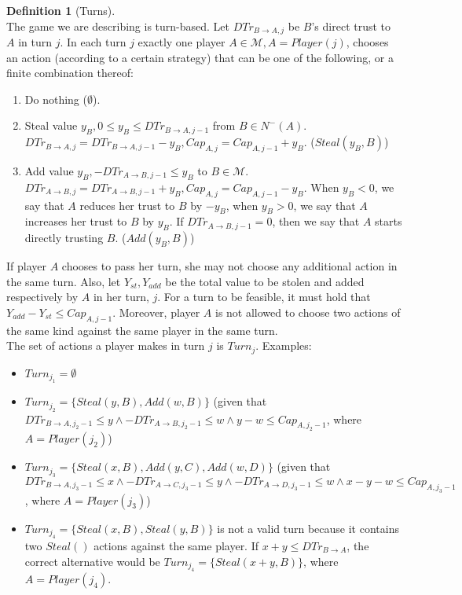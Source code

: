 \documentclass[11pt]{article}
\theoremstyle{definition}
\newtheorem{definition}{Definition}[section]
\theoremstyle{corollary}
\theoremstyle{lemma}
\begin{document}
      \begin{definition}[Turns] \ \\
         The game we are describing is turn-based. Let $DTr_{B \rightarrow A, j}$ be $B$'s direct trust to $A$ in turn $j$.
         In each turn $j$ exactly one player $A \in \mathcal{M}, A = Player(j)$, chooses an action (according to a certain
         strategy) that can be one of the following, or a finite combination thereof:
         \begin{enumerate}
            \item Do nothing ($\emptyset$).
            \item Steal value $y_B, 0 \leq y_B \leq DTr_{B \rightarrow A, j-1}$ from $B \in N^{-}(A)$.
            $DTr_{B \rightarrow A, j} = DTr_{B \rightarrow A, j-1} - y_B, Cap_{A,j} = Cap_{A,j-1} + y_B$.
            ($Steal(y_B, B)$)
            \item Add value $y_B, -DTr_{A \rightarrow B, j-1} \leq y_B$ to $B \in \mathcal{M}$.
            $DTr_{A \rightarrow B, j} = DTr_{A \rightarrow B, j-1} + y_B, Cap_{A,j} = Cap_{A,j-1} - y_B $. When
            $y_B < 0$, we say that $A$ reduces her trust to $B$ by $-y_B$, when $y_B > 0$, we say that $A$ increases her
            trust to $B$ by $y_B$. If $DTr_{A \rightarrow B, j-1} = 0$, then we say that $A$ starts directly trusting $B$.
            ($Add(y_B, B)$)
         \end{enumerate}
         If player $A$ chooses to pass her turn, she may not choose any additional action in the same turn.
         Also, let $Y_{st}, Y_{add}$ be the total value to be stolen and added respectively by $A$ in her turn, $j$. For a
         turn to be feasible, it must hold that $Y_{add} - Y_{st} \leq Cap_{A,j-1}$. Moreover, player $A$ is not allowed to
         choose two actions of the same kind against the same player in the same turn. \\
         The set of actions a player makes in turn $j$ is $Turn_j$. Examples:
         \begin{itemize}
            \item $Turn_{j_1} = \emptyset$
            \item $Turn_{j_2} = \{Steal(y, B), Add(w, B)\}$ (given that $DTr_{B \rightarrow A, j_2 - 1} \leq y \wedge
            -DTr_{A \rightarrow B, j_2 - 1} \leq w \wedge y - w \leq Cap_{A, j_2-1}$, where $A = Player(j_2)$)
            \item $Turn_{j_3} = \{Steal(x, B), Add(y, C), Add(w, D)\}$ (given that $DTr_{B \rightarrow A, j_3 - 1} \leq x
            \wedge -DTr_{A \rightarrow C, j_3-1} \leq y \wedge -DTr_{A \rightarrow D, j_3 - 1} \leq w \wedge
            x - y - w \leq Cap_{A, j_3-1}$, where $A = Player(j_3)$)
            \item $Turn_{j_4} = \{Steal(x, B), Steal(y, B)\}$ is not a valid turn because it contains two $Steal()$ actions
            against the same player. If $x + y \leq DTr_{B \rightarrow A}$, the correct alternative would be $Turn_{j_4} =
            \{Steal(x+y, B)\}$, where $A = Player(j_4)$.
         \end{itemize}
      \end{definition}
\end{document}
